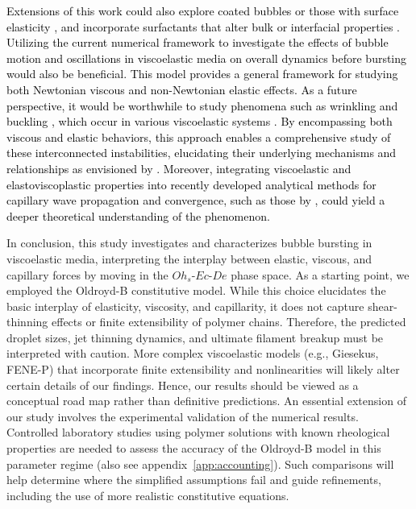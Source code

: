 \documentclass{jfm}
\newcommand{\VS}[1]{{\textcolor{black}{#1}}}
\newcommand{\oo}{\color{black} \normalfont}
\begin{document}
\VS{Extensions of this work could also explore coated bubbles \citep{dollet2019bubble, yang2023enhanced} or those with surface elasticity \citep{ji2023secondary}, and incorporate surfactants that alter bulk or interfacial properties \citep{constante2021dynamics,lohse2022fundamental,pierre2022influence,pico2024drop}.
Utilizing the current numerical framework to investigate the effects of bubble motion \citep{beris1985creeping,moschopoulos2021concept} and oscillations in viscoelastic media \citep{dollet2019bubble, oratis2024unifying} on overall dynamics before bursting would also be beneficial.
This model provides a general framework for studying both Newtonian viscous and non-Newtonian elastic effects. As a future perspective, it would be worthwhile to study phenomena such as wrinkling \citep{debregeas1998life, oratis2020new, davidovitch2024viscous} and buckling \citep{le2012buckling,timoshenko2012theory}, which occur in various viscoelastic systems \citep{schmalholz1999buckling,lee2024buckling,matoz2020wrinkle}.
By encompassing both viscous and elastic behaviors, this approach enables a comprehensive study of these interconnected instabilities, elucidating their underlying mechanisms and relationships as envisioned by \citet{stokes1845,rayleigh1896theory,taylor1969instability}. Moreover, integrating viscoelastic and elastoviscoplastic \citep{francca2024elasto,ari2024bursting} properties into recently developed analytical methods for capillary wave propagation and convergence, such as those by \citet{kayal2024focusing}, could yield a deeper theoretical understanding of the phenomenon.}

In conclusion, this study investigates and characterizes bubble bursting in viscoelastic media, interpreting the interplay between elastic, viscous, and capillary forces by moving in the $Oh_s$-$Ec$-$De$ phase space. 
\oo
As a starting point, we employed the Oldroyd-B constitutive model. While this choice elucidates the basic interplay of elasticity, viscosity, and capillarity, it does not capture shear-thinning effects or finite extensibility of polymer chains. Therefore, the predicted droplet sizes, jet thinning dynamics, and ultimate filament breakup must be interpreted with caution. More complex viscoelastic models (e.g., Giesekus, FENE-P) that incorporate finite extensibility and nonlinearities will likely alter certain details of our findings. Hence, our results should be viewed as a conceptual road map rather than definitive predictions. 
An essential extension of our study involves the experimental validation of the numerical results. Controlled laboratory studies using polymer solutions with known rheological properties are needed to assess the accuracy of the Oldroyd-B model in this parameter regime (also see appendix~\ref{app:accounting}). Such comparisons will help determine where the simplified assumptions fail and guide refinements, including the use of more realistic constitutive equations.
\end{document}
